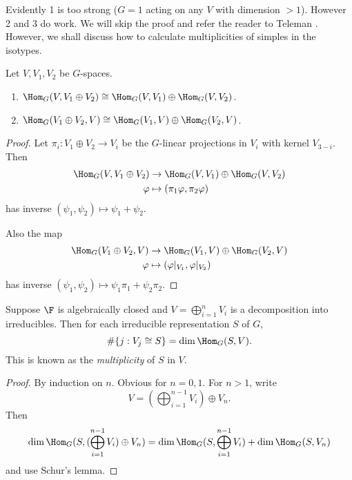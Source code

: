 \documentclass[a4paper]{article}
\theoremstyle{definition}
\begin{document}
Evidently 1 is too strong (\(G = 1\) acting on any \(V\) with dimension \(> 1\)). However 2 and 3 do work. We will skip the proof and refer the reader to Teleman . However, we shall discuss how to calculate multiplicities of simples in the isotypes.

\begin{lemma}
  Let \(V, V_1, V_2\) be \(G\)-spaces.
  \begin{enumerate}
  \item \(\Hom_G(V, V_1 \oplus V_2) \cong \Hom_G(V, V_1) \oplus \Hom_G(V, V_2)\).
  \item \(\Hom_G(V_1 \oplus V_2, V) \cong \Hom_G(V_1, V) \oplus \Hom_G(V_2, V)\).
  \end{enumerate}
\end{lemma}

\begin{proof}
  Let \(\pi_i: V_1 \oplus V_2 \to V_i\) be the \(G\)-linear projections in \(V_i\) with kernel \(V_{3 - i}\). Then
  \begin{align*}
    \Hom_G(V, V_1 \oplus V_2) &\to \Hom_G(V, V_1) \oplus \Hom_G(V, V_2) \\
    \varphi &\mapsto (\pi_1 \varphi, \pi_2 \varphi)
  \end{align*}
  has inverse \((\psi_1, \psi_2) \mapsto \psi_1 + \psi_2\).

  Also the map
  \begin{align*}
    \Hom_G(V_1 \oplus V_2, V) &\to \Hom_G(V_1, V) \oplus \Hom_G(V_2, V) \\
    \varphi &\mapsto (\varphi|_{V_1}, \varphi|_{V_2})
  \end{align*}
  has inverse \((\psi_1, \psi_2) \mapsto \psi_1 \pi_1 + \psi_2 \pi_2\).
\end{proof}

\begin{corollary}
  Suppose \(\F\) is algebraically closed and \(V = \bigoplus_{i = 1}^n V_i\) is a decomposition into irreducibles. Then for each irreducible representation \(S\) of \(G\),
  \[
    \# \{j: V_j \cong S\} = \dim \Hom_G(S, V).
  \]
  This is known as the \emph{multiplicity} of \(S\) in \(V\).
\end{corollary}

\begin{proof}
  By induction on \(n\). Obvious for \(n = 0, 1\). For \(n > 1\), write
  \[
    V = (\bigoplus_{i = 1}^{n - 1} V_i) \oplus V_n.
  \]
  Then
  \[
    \dim \Hom_G(S, (\bigoplus_{i = 1}^{n - 1} V_i) \oplus V_n)
    = \dim \Hom_G(S, \bigoplus_{i = 1}^{n - 1} V_i) + \dim \Hom_G(S, V_n)
  \]
  and use Schur's lemma.
\end{proof}
\end{document}
